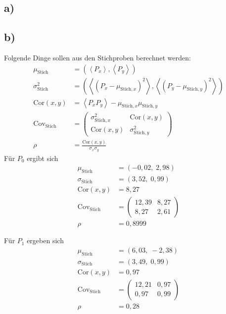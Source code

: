 \subsection{a)}



\subsection{b)}
Folgende Dinge sollen aus den Stichproben berechnet werden:
\begin{align}
  \mu_{\text{Stich}}         &=\left(\left\langle P_x\right\rangle,\left\langle P_y\right\rangle\right)\\
  \sigma_{\text{Stich}}^2    &=\left(\left\langle(P_x-\mu_{\text{Stich},x})^2\right\rangle,\left\langle(P_y-\mu_{\text{Stich},y})^2\right\rangle\right)\\
  \text{Cor}(x,y)            &=\left\langle P_xP_y\right\rangle-\mu_{\text{Stich},x}\mu_{\text{Stich},y}\\
  \text{Cov}_{\text{Stich}}  &=\left(
  \begin{array}{rr}
    \sigma_{\text{Stich},x}^2   & \text{Cor}(x,y)\\
    \text{Cor}(x,y)             & \sigma_{\text{Stich},y}^2
  \end{array}
                            \right)\\
  \rho                       &=\frac{\text{Cor}(x,y)}{\sigma_x\sigma_y}
\end{align}
Für $P_0$ ergibt sich
\begin{align}
  \mu_{\text{Stich}}         &=\left(-0,02,\; 2,98\right)\\
  \sigma_{\text{Stich}}      &=\left(3,52, \; 0,99\right)\\
  \text{Cor}(x,y)            &=8,27\\
  \text{Cov}_{\text{Stich}}  &=\left(
  \begin{array}{rr}
    12,39   & 8,27\\
    8,27    & 2,61
  \end{array}
                            \right)\\
  \rho                       &=0,8999
\end{align}

Für $P_1$ ergeben sich
\begin{align}
  \mu_{\text{Stich}}         &=\left(6,03,\;  -2,38\right)\\
  \sigma_{\text{Stich}}      &=\left(3,49,\;  0,99\right)\\
  \text{Cor}(x,y)            &=0,97\\
  \text{Cov}_{\text{Stich}}  &=\left(
  \begin{array}{rr}
    12,21   & 0,97\\
    0,97    & 0,99
  \end{array}
                            \right)\\
  \rho                       &=0,28
\end{align}

